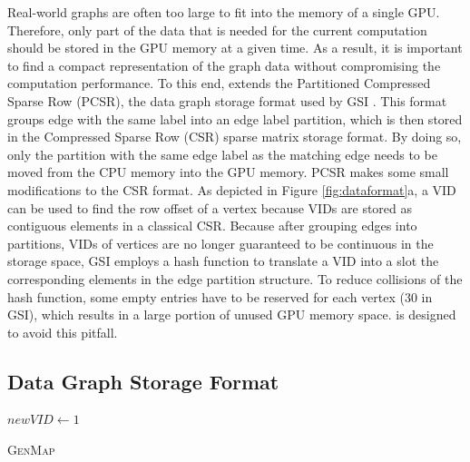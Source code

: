 Real-world graphs are often too large to fit into the memory of a single GPU. Therefore, only part of the data that is needed for the
current computation should be stored in the GPU memory at a given time. As a result, it is important to find a compact representation of
the graph data without compromising the computation performance. To this end, \SystemName extends the Partitioned Compressed Sparse Row
(PCSR), the data graph storage format used by GSI \cite{zeng2020gsi}. This format groups edge with the same label into an edge label partition,
which is then stored in the Compressed Sparse Row (CSR) sparse matrix storage format. By doing so, only the partition with
the same edge label as the matching edge needs to be moved from the CPU memory into the GPU memory. PCSR makes some small modifications to
the CSR format. As depicted in Figure \ref{fig:dataformat}a, a VID can be used to find the row offset of a vertex because VIDs are stored
as contiguous elements in a classical CSR. Because after grouping edges into partitions, VIDs of vertices are no longer guaranteed to be
continuous in the storage space, GSI employs a hash function to translate a VID into a slot the
corresponding elements in the edge partition structure. To reduce collisions of the hash function, some empty entries have to be reserved
for each vertex (30 in GSI), which results in a large portion of unused GPU memory space. \SystemName is designed to avoid this pitfall.


\subsection{\SystemName Data Graph Storage Format}

\begin{algorithm}[t!]
$newVID \leftarrow 1$\;
\caption{\textsc{GenMap}}
\label{algo:genmap}
\end{algorithm}

